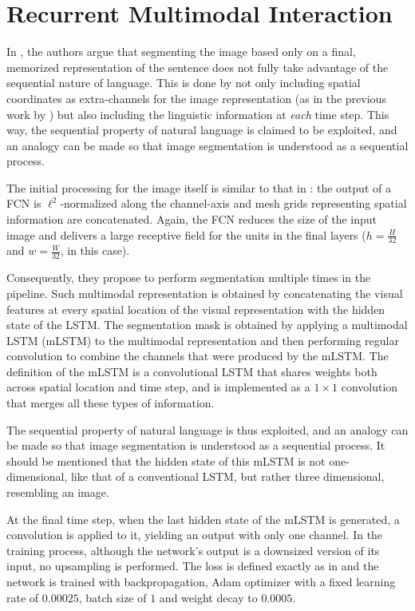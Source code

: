 \section{Recurrent Multimodal Interaction}
In \cite{liu2017segmentation}, the authors argue that segmenting the image based only on a final, memorized representation of the sentence does not fully take advantage of the sequential nature of language. This is done by not only including spatial coordinates as extra-channels for the image representation (as in the previous work by \cite{hu2016segmentation}) but also including the linguistic information at \textit{each} time step. This way, the sequential property of natural language is claimed to be exploited, and an analogy can be made so that image segmentation is understood as a sequential process.

The initial processing for the image itself is similar to that in \cite{hu2016segmentation}: the output of a FCN is $\ell^2$-normalized along the channel-axis and mesh grids representing spatial information are concatenated. Again, the FCN reduces the size of the input image and delivers a large receptive field for the units in the final layers ($h = \frac{H}{32}$ and $w = \frac{W}{32}$, in this case).

Consequently, they propose to perform segmentation multiple times in the pipeline. Such multimodal representation is obtained by concatenating the visual features at every spatial location of the visual representation with the hidden state of the LSTM. The segmentation mask is obtained by applying a multimodal LSTM (mLSTM) to the multimodal representation and then performing regular convolution to combine the channels that were produced by the mLSTM. The definition of the mLSTM is a convolutional LSTM that shares weights both across spatial location and time step, and is implemented as a $1\times1$ convolution that merges all these types of information. 

The sequential property of natural language is thus exploited, and an analogy can be made so that image segmentation is understood as a sequential process. It should be mentioned that the hidden state of this mLSTM is not one-dimensional, like that of a conventional LSTM, but rather three dimensional, resembling an image. 

At the final time step, when the last hidden state of the mLSTM is generated, a convolution is applied to it, yielding an output with only one channel. In the training process, although the network's output is a downsized version of its input, no upsampling is performed. The loss is defined exactly as in \cite{hu2016segmentation} and the network is trained with backpropagation, Adam optimizer with a fixed learning rate of $0.00025$, batch size of $1$ and weight decay to $0.0005$.


